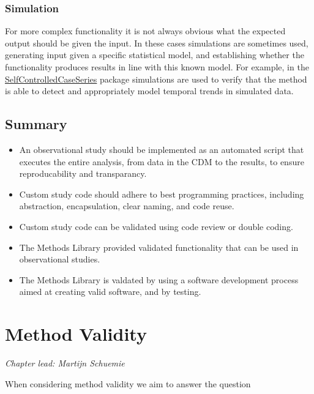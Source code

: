 \documentclass[11pt]{book}
\theoremstyle{definition}
\theoremstyle{definition}
\theoremstyle{definition}
\theoremstyle{remark}
\let\BeginKnitrBlock\begin \let\EndKnitrBlock\end
\begin{document}
\hypertarget{simulation}{%
\subsection{Simulation}\label{simulation}}

For more complex functionality it is not always obvious what the expected output should be given the input. In these cases simulations are sometimes used, generating input given a specific statistical model, and establishing whether the functionality produces results in line with this known model. For example, in the \href{https://ohdsi.github.io/SelfControlledCaseSeries/}{SelfControlledCaseSeries} package simulations are used to verify that the method is able to detect and appropriately model temporal trends in simulated data.

\hypertarget{summary-9}{%
\section{Summary}\label{summary-9}}

\BeginKnitrBlock{rmdsummary}
\begin{itemize}
\item
  An observational study should be implemented as an automated script that executes the entire analysis, from data in the CDM to the results, to ensure reproducability and transparancy.
\item
  Custom study code should adhere to best programming practices, including abstraction, encapsulation, clear naming, and code reuse.
\item
  Custom study code can be validated using code review or double coding.
\item
  The Methods Library provided validated functionality that can be used in observational studies.
\item
  The Methods Library is valdated by using a software development process aimed at creating valid software, and by testing.
\end{itemize}
\EndKnitrBlock{rmdsummary}

\hypertarget{MethodValidity}{%
\chapter{Method Validity}\label{MethodValidity}}

\emph{Chapter lead: Martijn Schuemie}

When considering method validity we aim to answer the question
\end{document}
